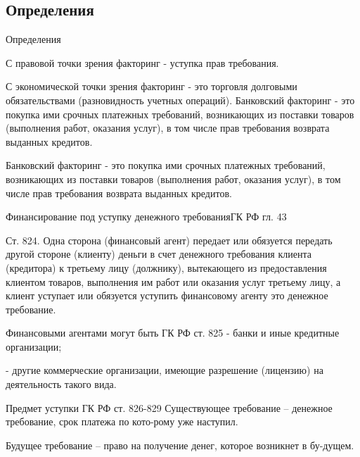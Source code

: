 \documentclass[_Banking_p3.tex]{subfiles}
\begin{document}
\subsection{Определения}
\begin{frame} [ allowframebreaks]{Определения}
\begin{block}{С правовой точки зрения факторинг }
\quad
- уступка прав требования.
\end{block}

\begin{block}{С экономической точки зрения факторинг  }
\quad
- это торговля долговыми обязательствами (разновидность учетных операций). Банковский факторинг - это покупка ими срочных платежных требований, возникающих из поставки товаров (выполнения работ, оказания услуг), в том числе прав требования возврата выданных кредитов.
\end{block}

\pagebreak

\begin{block}{Банковский факторинг }
\quad
- это покупка ими срочных платежных требований, возникающих из поставки товаров (выполнения работ, оказания услуг), в том числе прав требования возврата выданных кредитов.
\end{block}

\end{frame}

\begin{frame}{Финансирование под уступку денежного требования}{ГК РФ гл. 43}

Ст. 824. Одна сторона (финансовый агент) передает или обязуется передать другой стороне (клиенту) деньги в счет денежного требования клиента (кредитора) к третьему лицу (должнику), вытекающего из предоставления клиентом товаров, выполнения им работ или оказания услуг третьему лицу, а клиент уступает или обязуется уступить финансовому агенту это денежное требование.

\end{frame}

\begin{frame}{Финансовыми агентами могут быть }{ГК РФ ст. 825}
- банки и иные кредитные организации;

- другие коммерческие организации, имеющие разрешение (лицензию) на деятельность такого вида.

\end{frame}

\begin{frame}{Предмет уступки }{ГК РФ ст. 826-829}
Существующее требование – денежное требование, срок платежа по кото-рому уже наступил.

Будущее требование – право на получение денег, которое возникнет в бу-дущем.

\end{frame}
\end{document}
